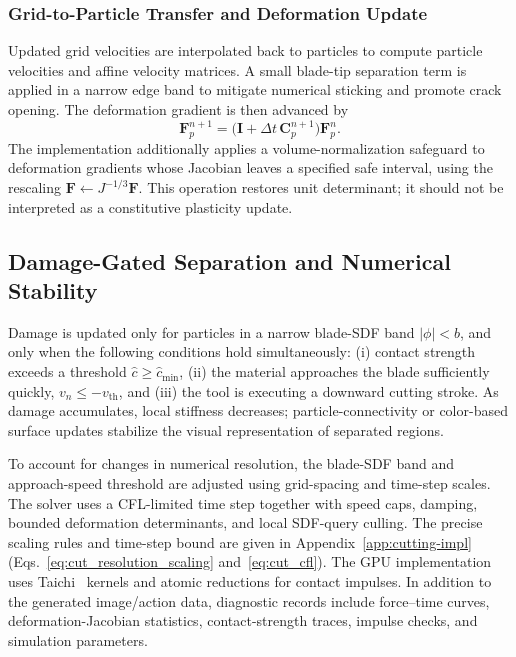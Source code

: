 \subsubsection{Grid-to-Particle Transfer and Deformation Update}
Updated grid velocities are interpolated back to particles to compute particle velocities and affine velocity matrices. A small blade-tip separation term is applied in a narrow edge band to mitigate numerical sticking and promote crack opening. The deformation gradient is then advanced by
\begin{equation}\label{eq:Fupdate}
  \mathbf{F}_p^{n+1}=\bigl(\mathbf{I}+\Delta t\,\mathbf{C}_p^{n+1}\bigr)
  \mathbf{F}_p^n.
\end{equation}
The implementation additionally applies a volume-normalization safeguard to deformation gradients whose Jacobian leaves a specified safe interval, using the rescaling $\mathbf{F}\leftarrow J^{-1/3}\mathbf{F}$. This operation restores unit determinant; it should not be interpreted as a constitutive plasticity update.

\subsection{Damage-Gated Separation and Numerical Stability}
\label{subsec:cut_damage}

Damage is updated only for particles in a narrow blade-SDF band $|\phi|<b$, and only when the following conditions hold simultaneously: (i) contact strength exceeds a threshold $\hat c\ge\hat c_{\min}$, (ii) the material approaches the blade sufficiently quickly, $v_n\le-v_{\mathrm{th}}$, and (iii) the tool is executing a downward cutting stroke. As damage accumulates, local stiffness decreases; particle-connectivity or color-based surface updates stabilize the visual representation of separated regions.

To account for changes in numerical resolution, the blade-SDF band and approach-speed threshold are adjusted using grid-spacing and time-step scales. The solver uses a CFL-limited time step together with speed caps, damping, bounded deformation determinants, and local SDF-query culling. The precise scaling rules and time-step bound are given in Appendix~\ref{app:cutting-impl} (Eqs.~\eqref{eq:cut_resolution_scaling} and~\eqref{eq:cut_cfl}). The GPU implementation uses Taichi~\citep{hu2019taichi} kernels and atomic reductions for contact impulses. In addition to the generated image/action data, diagnostic records include force--time curves, deformation-Jacobian statistics, contact-strength traces, impulse checks, and simulation parameters.

